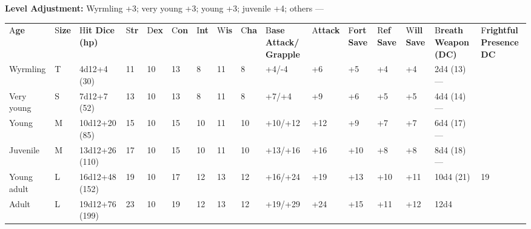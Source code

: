\documentclass{article}
\begin{document}
\textbf{Level Adjustment:} Wyrmling +3; very young +3; young +3; juvenile +4; others 
---

\vspace{12pt}
\begin{tabular}{|>{\raggedright}p{18pt}|>{\raggedright}p{6pt}|>{\raggedright}p{17pt}|>{\raggedright}p{4pt}|>{\raggedright}p{6pt}|>{\raggedright}p{6pt}|>{\raggedright}p{4pt}|>{\raggedright}p{6pt}|>{\raggedright}p{6pt}|>{\raggedright}p{13pt}|>{\raggedright}p{10pt}|>{\raggedright}p{7pt}|>{\raggedright}p{7pt}|>{\raggedright}p{7pt}|>{\raggedright}p{18pt}|>{\raggedright}p{16pt}|}
\hline
\multicolumn{16}{|p{158pt}|}{B\textbf{lack Dragons by Age}}\tabularnewline
\hline
A{\small{}\textbf{ge}} & S{\small{}\textbf{ize}} & H{\small{}\textbf{it Dice (hp)}} & S{\small{}\textbf{tr}} & D{\small{}\textbf{ex}} & C{\small{}\textbf{on}} & I{\small{}\textbf{nt}} & W{\small{}\textbf{is}} & C{\small{}\textbf{ha}} & B{\small{}\textbf{ase 
Attack/}}\linebreak{}
{\small{}\textbf{Grapple}} & A{\small{}\textbf{ttack}} & F{\small{}\textbf{ort 
Save}} & R{\small{}\textbf{ef Save}} & W{\small{}\textbf{ill Save}} & B{\small{}\textbf{reath 
Weapon (DC)}} & F{\small{}\textbf{rightful Presence DC}}\tabularnewline
\hline
W{\small{}yrmling} & T & 4{\small{}d12+4 (30)} & 1{\small{}1} & 1{\small{}0} & 1{\small{}3} & 8 & 1{\small{}1} & 8 & +{\small{}4/-4} & +{\small{}6} & +{\small{}5} & +{\small{}4} & +{\small{}4} & 2{\small{}d4 
(13)}--- & \tabularnewline
\hline
V{\small{}ery young} & S & 7{\small{}d12+7 (52)} & 1{\small{}3} & 1{\small{}0} & 1{\small{}3} & 8 & 1{\small{}1} & 8 & +{\small{}7/+4} & +{\small{}9} & +{\small{}6} & +{\small{}5} & +{\small{}5} & 4{\small{}d4 
(14)}--- & \tabularnewline
\hline
Y{\small{}oung} & M & 1{\small{}0d12+20 (85)} & 1{\small{}5} & 1{\small{}0} & 1{\small{}5} & 1{\small{}0} & 1{\small{}1} & 1{\small{}0} & +{\small{}10/+12} & +{\small{}12} & +{\small{}9} & +{\small{}7} & +{\small{}7} & 6{\small{}d4 
(17)}--- & \tabularnewline
\hline
J{\small{}uvenile} & M & 1{\small{}3d12+26 (110)} & 1{\small{}7} & 1{\small{}0} & 1{\small{}5} & 1{\small{}0} & 1{\small{}1} & 1{\small{}0} & +{\small{}13/+16} & +{\small{}16} & +{\small{}10} & +{\small{}8} & +{\small{}8} & 8{\small{}d4 
(18)}--- & \tabularnewline
\hline
Y{\small{}oung adult} & L & 1{\small{}6d12+48 (152)} & 1{\small{}9} & 1{\small{}0} & 1{\small{}7} & 1{\small{}2} & 1{\small{}3} & 1{\small{}2} & +{\small{}16/+24} & +{\small{}19} & +{\small{}13} & +{\small{}10} & +{\small{}11} & 1{\small{}0d4 
(21)} & 1{\small{}9}\tabularnewline
\hline
A{\small{}dult} & L & 1{\small{}9d12+76 (199)} & 2{\small{}3} & 1{\small{}0} & 1{\small{}9} & 1{\small{}2} & 1{\small{}3} & 1{\small{}2} & +{\small{}19/+29} & +{\small{}24} & +{\small{}15} & +{\small{}11} & +{\small{}12} & 1{\small{}2d4 
}
\end{tabular}
\end{document}
